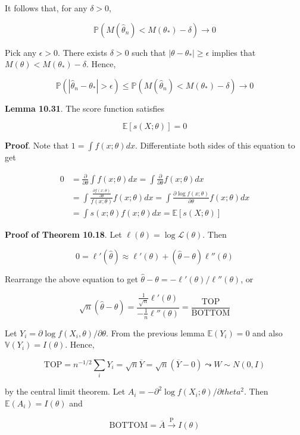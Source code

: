 It follows that, for any \(\delta > 0\),

\[\mathbb{P}(M(\hat{\theta}_n) < M(\theta_*) - \delta) \rightarrow 0\]

Pick any \(\epsilon > 0\). There exists \(\delta > 0\) such that
\(|\theta - \theta_*| \geq \epsilon\) implies that
\(M(\theta) < M(\theta_*) - \delta\). Hence,

\[\mathbb{P}(|\hat{\theta}_n - \theta_*| > \epsilon) \leq 
\mathbb{P}\left( M(\hat{\theta}_n) < M(\theta_*) - \delta \right) \rightarrow 0\]

\textbf{Lemma 10.31}. The score function satisfies

\[\mathbb{E}[s(X; \theta)] = 0\]

\textbf{Proof}. Note that \(1 = \int f(x; \theta) dx\). Differentiate
both sides of this equation to get

\begin{align}
0 &= \frac{\partial}{\partial \theta} \int f(x; \theta)dx = \int \frac{\partial}{\partial \theta} f(x; \theta) dx \\
&= \int \frac{\frac{\partial f(x; \theta)}{\partial \theta}}{f(x; \theta)} f(x; \theta) dx
= \int \frac{\partial \log f(x; \theta)}{\partial \theta} f(x; \theta) dx \\
&= \int s(x; \theta) f(x; \theta) dx = \mathbb{E}[s(X; \theta)]
\end{align}

\textbf{Proof of Theorem 10.18}. Let
\(\ell(\theta) = \log \mathcal{L}(\theta)\). Then

\[0 = \ell'(\hat{\theta}) \approx \ell'(\theta) + (\hat{\theta} - \theta) \ell''(\theta)\]

Rearrange the above equation to get
\(\hat{\theta} - \theta = -\ell'(\theta) / \ell''(\theta)\), or

\[ \sqrt{n}(\hat{\theta} - \theta) = \frac{\frac{1}{\sqrt{n}}\ell'(\theta)}{-\frac{1}{n}\ell''(\theta)} = \frac{\text{TOP}}{\text{BOTTOM}}\]

Let \(Y_i = \partial \log f(X_i, \theta) / \partial \theta\). From the
previous lemma \(\mathbb{E}(Y_i) = 0\) and also
\(\mathbb{V}(Y_i) = I(\theta)\). Hence,

\[\text{TOP} = n^{-1/2} \sum_i Y_i = \sqrt{n} \overline{Y} = \sqrt{n} (\overline{Y} - 0) \leadsto W \sim N(0, I)\]

by the central limit theorem. Let
\(A_i = -\partial^2 \log f(X_i; \theta) / \partial theta^2\). Then
\(\mathbb{E}(A_i) = I(\theta)\) and

\[\text{BOTTOM} = \overline{A} \xrightarrow{\text{P}} I(\theta)\]

